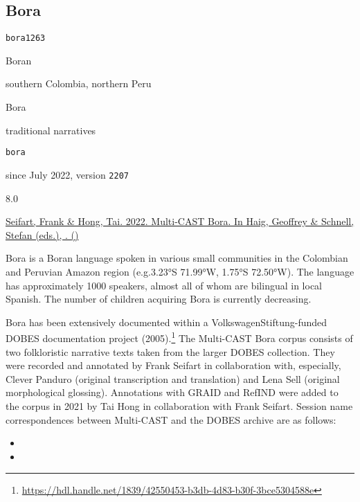 \subsection{Bora}
\label{ssec:corpus-bora}

\noindent{}

\begin{description}[labelwidth=6.5em,itemindent=0em,itemsep=0.25mm]
	\TabPositions{2em}
	\raggedright\small
	\item[glottocode]		\texttt{bora1263}
	\item[affiliation]		Boran
	\item[area spoken]		southern Colombia, northern Peru
	\item[varieties rec'd]	Bora
	\item[text types]		traditional narratives
	\medskip
	\item[identifier]		\texttt{bora}
	\item[availability]		since July 2022, version \texttt{2207}
	\item[GRAID]		8.0		
	\item[RefIND]		\checkyes{}	
	\item[ISNRef]		\checkyes{}	
	\item[citation]		\hyperref[ssec:references-mc]{Seifart, Frank \& Hong, Tai. 2022. Multi-CAST Bora. In Haig, Geoffrey \& Schnell, Stefan (eds.), . ()} \nocite{Seifart.Hong2022}
\end{description}

\noindent Bora is a Boran language spoken in various small communities in the Colombian and Peruvian Amazon region (e.g.\@ 3.23°S 71.99°W, 1.75°S 72.50°W). The language has approximately \num{1000} speakers, almost all of whom are bilingual in local Spanish. The number of children acquiring Bora is currently decreasing.

Bora has been extensively documented within a VolkswagenStiftung-funded DOBES documentation project (2005).\footnote{\url{https://hdl.handle.net/1839/42550453-b3db-4d83-b30f-3bce5304588e}} The Multi-CAST Bora corpus consists of two folkloristic narrative texts taken from the larger DOBES collection. They were recorded and annotated by Frank Seifart in collaboration with, especially, Clever Panduro (original transcription and translation) and Lena Sell (original morphological glossing). Annotations with GRAID and RefIND were added to the corpus in 2021 by Tai Hong in collaboration with Frank Seifart.
%
Session name correspondences between Multi-CAST and the DOBES archive are as follows:
%
\begin{itemize}
	\TabPositions{7em}
	\item	{}		\tab	{}
	\item	{}	\tab	{}
\end{itemize}


